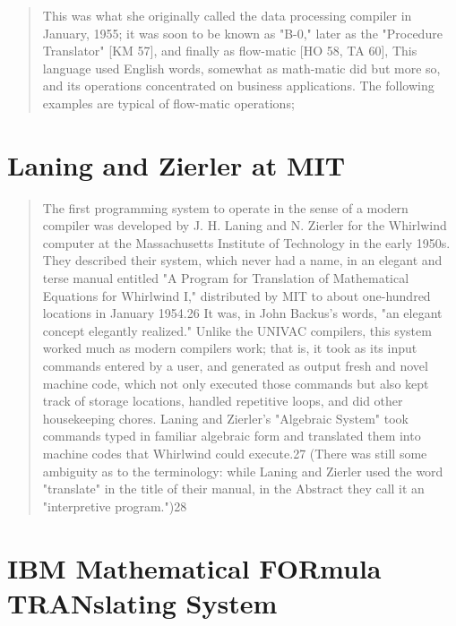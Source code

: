 \begin{quotation}
This was what she originally called the data processing compiler in January, 
1955; it was soon to be known as "B-0," later as the "Procedure Translator" [KM 
57], and finally as flow-matic [HO 58, TA 60], This language used English 
words, somewhat as math-matic did but more so, and its operations concentrated 
on business applications. The following examples are typical of flow-matic 
operations;
\cite{history_of_computing_in_the_twentieth_century_1980}
\end{quotation}

\section{Laning and Zierler at MIT}

\begin{quotation}
The first programming system to operate in the sense of a modern compiler was 
developed by J. H. Laning and N. Zierler for the Whirlwind computer at the 
Massachusetts Institute of Technology in the early 1950s. They described their 
system, which never had a name, in an elegant and terse manual entitled "A 
Program for Translation of Mathematical Equations for Whirlwind I," distributed 
by MIT to about one-hundred locations in January 1954.26 It was, in John 
Backus's words, "an elegant concept elegantly realized." Unlike the UNIVAC 
compilers, this system worked much as modern compilers work; that is, it took 
as its input commands entered by a user, and generated as output fresh and 
novel machine code, which not only executed those commands but also kept track 
of storage locations, handled repetitive loops, and did other housekeeping 
chores. Laning and Zierler's "Algebraic System" took commands typed in familiar 
algebraic form and translated them into machine codes that Whirlwind could 
execute.27 (There was still some ambiguity as to the terminology: while Laning 
and Zierler used the word "translate" in the title of their manual, in the 
Abstract they call it an "interpretive program.")28
\cite{new-history-of-modern-computing}
\end{quotation}

\section{IBM Mathematical FORmula TRANslating System}

